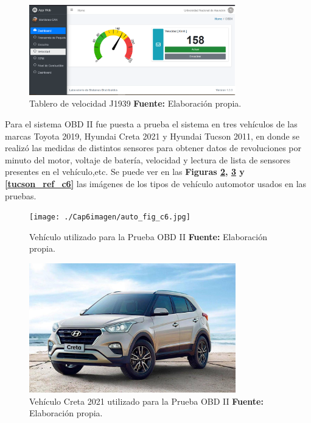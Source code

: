 \begin{figure}[H]
	\centering
	\includegraphics[width=0.8\textwidth]{./Cap6imagen/gauge_fig_c6.png}
	\caption [Tablero de Velocidad J1939.]{Tablero de velocidad J1939 \textbf{ Fuente:} %
		Elaboración propia.}
	\label{gauge_ref_c6} %
\end{figure}

Para el sistema OBD II fue puesta a prueba el sistema en tres vehículos de las marcas Toyota 2019, Hyundai Creta 2021 y Hyundai Tucson 2011, en donde se realizó las medidas de distintos sensores para obtener datos de revoluciones por minuto del motor, voltaje de batería, velocidad y lectura de lista de sensores presentes en el vehículo,etc. Se puede ver en las \textbf{Figuras \ref{auto_ref_c6}, \ref{creta_ref_c6} y \ref{tucson_ref_c6} }  las imágenes de los tipos de vehículo automotor usados en las pruebas. 

\begin{figure}[H]
	\centering
	\texttt{[image: ./Cap6imagen/auto\_fig\_c6.jpg]}
	\caption [Vehículo utilizado para la Prueba OBD II.]{Vehículo utilizado para la Prueba OBD II \textbf{ Fuente:} %
		Elaboración propia.}
	\label{auto_ref_c6} %
\end{figure}

\begin{figure}[H]
	\centering
	\includegraphics[width=0.8\textwidth]{./Cap6imagen/creta_fig_c6.jpg}
	\caption [Vehículo Creta 2021 utilizado para la Prueba OBD II.]{Vehículo Creta 2021 utilizado para la Prueba OBD II \textbf{ Fuente:} %
		Elaboración propia.}
	\label{creta_ref_c6} %
\end{figure}

